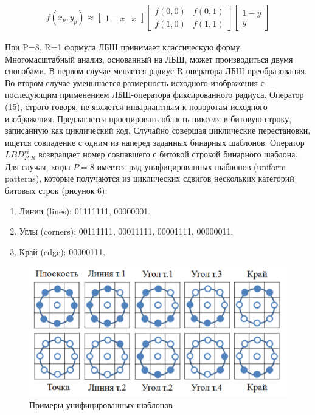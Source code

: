 \begin{gather}
f(x_p, y_p) \approx 
\begin{bmatrix}
  1-x & x
\end{bmatrix}
\begin{bmatrix}
  f(0,0) & f(0,1)\\
  f(1,0) & f(1,1)
\end{bmatrix}
\begin{bmatrix}
  1-y\\
  y
\end{bmatrix}
\end{gather}

При P=8, R=1 формула ЛБШ принимает классическую форму. Многомасштабный анализ, основанный на ЛБШ, может производиться  двумя способами. В первом случае меняется радиус R оператора ЛБШ-преобразования. Во  втором  случае  уменьшается  размерность  исходного  изображения  с последующим применением ЛБШ-оператора фиксированного радиуса. 
Оператор (15),  строго  говоря,  не  является  инвариантным  к  поворотам исходного изображения. Предлагается проецировать область пикселя в  битовую  строку,  записанную  как  циклический  код.  Случайно  совершая циклические  перестановки,  ищется  совпадение  с  одним  из  наперед  заданных бинарных шаблонов. Оператор $LBD_{P,R}^{ri}$ возвращает номер совпавшего с битовой строкой  бинарного  шаблона.  Для  случая,  когда $P=8$ имеется ряд унифицированных  шаблонов  (uniform patterns), которые 
получаются из циклических сдвигов нескольких категорий битовых строк (рисунок 6): 
\begin{enumerate}
\item Линии (lines): 01111111, 00000001.
\item Углы (corners): 00111111, 00011111, 00001111, 00000011.
\item Край (edge): 00000111.
\end{enumerate}

\begin{figure}[h!]
\centering
\includegraphics[scale=0.45]{res/pic006}
\caption{Примеры унифицированных шаблонов}
\end{figure}

